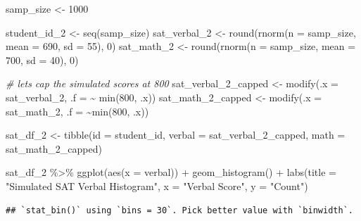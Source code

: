 \documentclass[
]{book}
\newenvironment{Shaded}{\begin{snugshade}}{\end{snugshade}}
\newcommand{\AttributeTok}[1]{\textcolor[rgb]{0.77,0.63,0.00}{#1}}
\newcommand{\CommentTok}[1]{\textcolor[rgb]{0.56,0.35,0.01}{\textit{#1}}}
\newcommand{\DecValTok}[1]{\textcolor[rgb]{0.00,0.00,0.81}{#1}}
\newcommand{\FunctionTok}[1]{\textcolor[rgb]{0.00,0.00,0.00}{#1}}
\newcommand{\NormalTok}[1]{#1}
\newcommand{\OtherTok}[1]{\textcolor[rgb]{0.56,0.35,0.01}{#1}}
\newcommand{\SpecialCharTok}[1]{\textcolor[rgb]{0.00,0.00,0.00}{#1}}
\newcommand{\StringTok}[1]{\textcolor[rgb]{0.31,0.60,0.02}{#1}}
\begin{document}
\begin{Shaded}
\begin{Highlighting}[]
\NormalTok{samp\_size }\OtherTok{\textless{}{-}} \DecValTok{1000}

\NormalTok{student\_id\_2 }\OtherTok{\textless{}{-}} \FunctionTok{seq}\NormalTok{(samp\_size)}
\NormalTok{sat\_verbal\_2 }\OtherTok{\textless{}{-}} \FunctionTok{round}\NormalTok{(}\FunctionTok{rnorm}\NormalTok{(}\AttributeTok{n =}\NormalTok{ samp\_size, }\AttributeTok{mean =} \DecValTok{690}\NormalTok{, }\AttributeTok{sd =} \DecValTok{55}\NormalTok{), }\DecValTok{0}\NormalTok{)}
\NormalTok{sat\_math\_2 }\OtherTok{\textless{}{-}} \FunctionTok{round}\NormalTok{(}\FunctionTok{rnorm}\NormalTok{(}\AttributeTok{n =}\NormalTok{ samp\_size, }\AttributeTok{mean =} \DecValTok{700}\NormalTok{, }\AttributeTok{sd =} \DecValTok{40}\NormalTok{), }\DecValTok{0}\NormalTok{)}

\CommentTok{\# let\textquotesingle{}s cap the simulated scores at 800}
\NormalTok{sat\_verbal\_2\_capped }\OtherTok{\textless{}{-}} \FunctionTok{modify}\NormalTok{(}\AttributeTok{.x =}\NormalTok{ sat\_verbal\_2, }\AttributeTok{.f =} \SpecialCharTok{\textasciitilde{}} \FunctionTok{min}\NormalTok{(}\DecValTok{800}\NormalTok{, .x))}
\NormalTok{sat\_math\_2\_capped }\OtherTok{\textless{}{-}} \FunctionTok{modify}\NormalTok{(}\AttributeTok{.x =}\NormalTok{ sat\_math\_2, }\AttributeTok{.f =} \SpecialCharTok{\textasciitilde{}}\FunctionTok{min}\NormalTok{(}\DecValTok{800}\NormalTok{, .x))}


\NormalTok{sat\_df\_2 }\OtherTok{\textless{}{-}} \FunctionTok{tibble}\NormalTok{(}\AttributeTok{id =}\NormalTok{ student\_id,}
                 \AttributeTok{verbal =}\NormalTok{ sat\_verbal\_2\_capped,}
                 \AttributeTok{math =}\NormalTok{ sat\_math\_2\_capped)}

\NormalTok{sat\_df\_2 }\SpecialCharTok{\%\textgreater{}\%} \FunctionTok{ggplot}\NormalTok{(}\FunctionTok{aes}\NormalTok{(}\AttributeTok{x =}\NormalTok{ verbal)) }\SpecialCharTok{+}
  \FunctionTok{geom\_histogram}\NormalTok{() }\SpecialCharTok{+}
  \FunctionTok{labs}\NormalTok{(}\AttributeTok{title =} \StringTok{"Simulated SAT Verbal Histogram"}\NormalTok{,}
       \AttributeTok{x =} \StringTok{"Verbal Score"}\NormalTok{,}
       \AttributeTok{y =} \StringTok{"Count"}\NormalTok{)}
\end{Highlighting}
\end{Shaded}

\begin{verbatim}
## `stat_bin()` using `bins = 30`. Pick better value with `binwidth`.
\end{verbatim}
\end{document}
